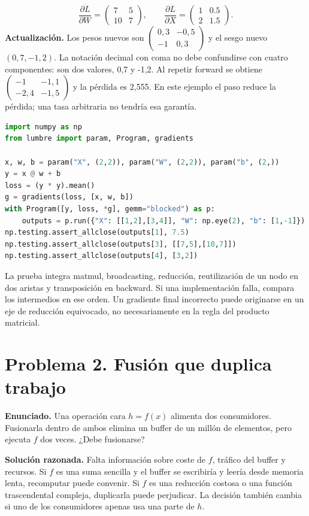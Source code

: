 \documentclass[12pt,a4paper,oneside]{report}
\begin{document}
\[
\frac{\partial L}{\partial W}=\begin{pmatrix}7&5\\10&7\end{pmatrix},\qquad
\frac{\partial L}{\partial X}=\begin{pmatrix}1&0.5\\2&1.5\end{pmatrix}.
\]
\textbf{Actualización.} Los pesos nuevos son $\left(\begin{smallmatrix}0,3&-0,5\\-1&0,3\end{smallmatrix}\right)$ y el sesgo nuevo $(0,7,-1,2)$. La notación decimal con coma no debe confundirse con cuatro componentes: son dos valores, 0,7 y -1,2. Al repetir forward se obtiene $\left(\begin{smallmatrix}-1&-1,1\\-2,4&-1,5\end{smallmatrix}\right)$ y la pérdida es 2,555. En este ejemplo el paso reduce la pérdida; una tasa arbitraria no tendría esa garantía.

\begin{lstlisting}[language=Python]
import numpy as np
from lumbre import param, Program, gradients

x, w, b = param("X", (2,2)), param("W", (2,2)), param("b", (2,))
y = x @ w + b
loss = (y * y).mean()
g = gradients(loss, [x, w, b])
with Program([y, loss, *g], gemm="blocked") as p:
    outputs = p.run({"X": [[1,2],[3,4]], "W": np.eye(2), "b": [1,-1]})
np.testing.assert_allclose(outputs[1], 7.5)
np.testing.assert_allclose(outputs[3], [[7,5],[10,7]])
np.testing.assert_allclose(outputs[4], [3,2])
\end{lstlisting}
La prueba integra matmul, broadcasting, reducción, reutilización de un nodo en dos aristas y transposición en backward. Si una implementación falla, compara los intermedios en ese orden. Un gradiente final incorrecto puede originarse en un eje de reducción equivocado, no necesariamente en la regla del producto matricial.

\section{Problema 2. Fusión que duplica trabajo}
\textbf{Enunciado.} Una operación cara $h=f(x)$ alimenta dos consumidores. Fusionarla dentro de ambos elimina un buffer de un millón de elementos, pero ejecuta $f$ dos veces. ¿Debe fusionarse?

\textbf{Solución razonada.} Falta información sobre coste de $f$, tráfico del buffer y recursos. Si $f$ es una suma sencilla y el buffer se escribiría y leería desde memoria lenta, recomputar puede convenir. Si $f$ es una reducción costosa o una función trascendental compleja, duplicarla puede perjudicar. La decisión también cambia si uno de los consumidores apenas usa una parte de $h$.
\end{document}
